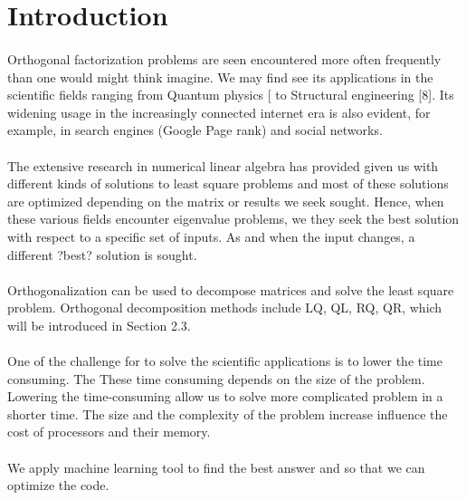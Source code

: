 \documentclass[pdftex,12pt,a4paper]{article}
\begin{document}
\section{Introduction}
\paragraph{}
Orthogonal factorization problems are seen encountered more often frequently than one would might think imagine. We may find see its applications in the scientific fields ranging from Quantum physics [ to Structural engineering [8]. Its widening usage in the increasingly connected internet era is also evident, for example, in search engines (Google Page rank) and social networks.
			
\paragraph{}					
The extensive research in numerical linear algebra has provided given us with different kinds of solutions to least square problems and most of these solutions are optimized depending on the matrix or results we seek sought. Hence, when these various fields encounter eigenvalue problems, we they seek the best solution with respect to a specific set of inputs. As and when the input changes, a different ?best? solution is sought.
\paragraph{}
Orthogonalization can be used to decompose matrices and solve the least square problem. Orthogonal decomposition methods include LQ, QL, RQ, QR, which will be introduced in Section 2.3.
\paragraph{}
One of the challenge for to solve the scientific applications is to lower the time consuming. The These time consuming depends on the size of the problem. Lowering the time-consuming allow us to solve more complicated problem in a shorter time. The size and the complexity of the problem increase influence the cost of processors and their memory. 
\paragraph{}

We apply machine learning tool  to find the best answer and so that we can optimize  the code. 
\paragraph{}
\end{document}
